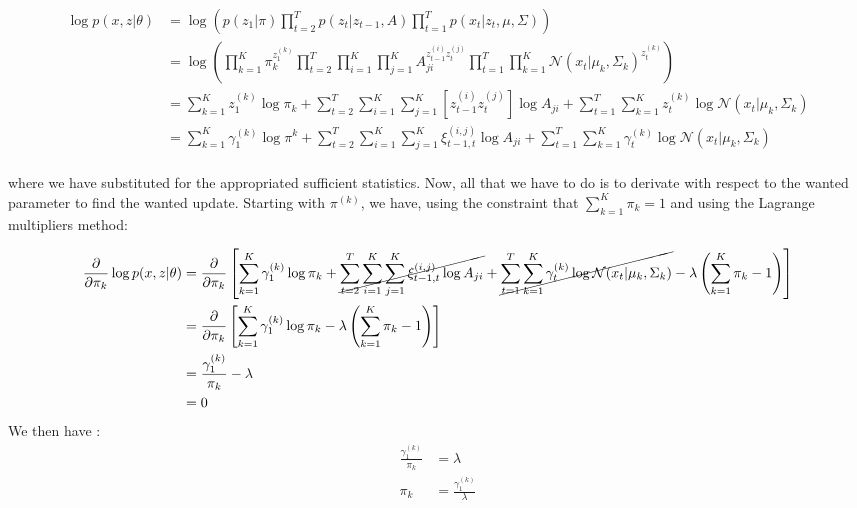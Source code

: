 \documentclass[11pt]{article}
\begin{document}
\begin{enumerate}
\begin{align*}
\log p(x,z|\theta) & = \log \left( p(z_1 | \pi) \prod_{t=2}^{T} p(z_t|z_{t-1},A) \prod_{t=1}^{T} p(x_t|z_t,\mu,\Sigma) \right) \\
				   & = \log \left( \prod_{k=1}^{K} \pi_{k} ^{z_{1}^{(k)}} \prod_{t=2}^{T} \prod_{i=1}^{K} \prod_{j=1}^{K} A_{ji}^{z_{t-1}^{(i)}z_{t}^{(j)}} \prod_{t=1}^{T} \prod_{k=1}^{K} \mathcal{N}(x_t|\mu_k,\Sigma_k)^{z_{t}^{(k)}} \right) \\
				   & = \sum_{k=1}^{K} z_{1}^{(k)} \log \pi_{k} + \sum_{t=2}^{T} \sum_{i=1}^{K}\sum_{j = 1}^{K} \left[z_{t-1}^{(i)}z_{t}^{(j)} \right] \log A_{ji} + \sum_{t=1}^{T} \sum_{k=1}^{K} z_{t}^{(k)} \log\mathcal{N}(x_t|\mu_k,\Sigma_k)\\
				   & = \sum_{k=1}^{K} \gamma_{1}^{(k)} \log \pi^{k} + \sum_{t=2}^{T} \sum_{i=1}^{K}\sum_{j = 1}^{K} \xi_{t-1,t}^{(i,j)} \log A_{ji} + \sum_{t=1}^{T} \sum_{k=1}^{K} \gamma_{t}^{(k)} \log\mathcal{N}(x_t|\mu_k,\Sigma_k)\\
\end{align*}


where we have substituted for the appropriated sufficient statistics. Now, all that we have to do is to derivate with respect to the wanted parameter to find the wanted update. Starting with $\pi^{(k)}$, we have, using the constraint that $\sum_{k=1}^{K} \pi_k = 1$ and using the Lagrange multipliers method:

{\small
\begin{align*}
\frac{\partial}{\partial \pi_k} \log p(x,z|\theta) & = \frac{\partial}{\partial \pi_k}\left[ \sum_{k=1}^{K} \gamma_{1}^{(k)} \log \pi_{k} + \cancel{\sum_{t=2}^{T} \sum_{i=1}^{K}\sum_{j = 1}^{K} \xi_{t-1,t}^{(i,j)} \log A_{ji}} + \cancel{\sum_{t=1}^{T} \sum_{k=1}^{K} \gamma_{t}^{(k)} \log\mathcal{N}(x_t|\mu_k,\Sigma_k)} - \lambda\left(\sum_{k=1}^{K} \pi_k - 1\right)\right]\\
												   & = \frac{\partial}{\partial \pi_k} \left[\sum_{k=1}^{K} \gamma_{1}^{(k)} \log \pi_{k} - \lambda\left(\sum_{k=1}^{K} \pi_{k} - 1\right)\right]\\
												   & =	\frac{\gamma_{1}^{(k)}}{\pi_k} - \lambda \\
												   & = 0 \\
\end{align*}
We then have :
\begin{align*}
								\frac{\gamma_{1}^{(k)}}{\pi_k} &= \lambda \\
								\pi_k &= \frac{\gamma_{1}^{(k)}}{\lambda}	   
\end{align*}
}


\end{enumerate}
\end{document}
